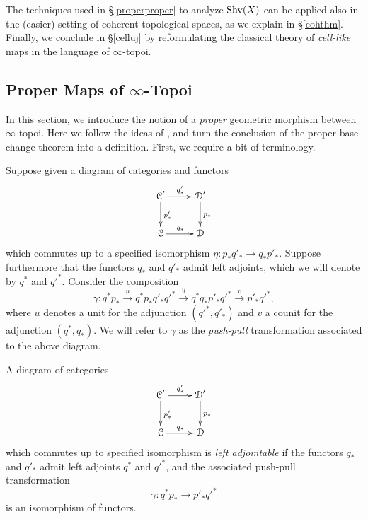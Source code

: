The techniques used in \S \ref{properproper} to analyze $\operatorname{Shv}(X)$ can be applied also in the (easier) setting of coherent topological spaces, as we explain in \S \ref{cohthm}. Finally, we conclude in \S \ref{celluj} by reformulating the classical theory of {\em cell-like} maps in the language of $\infty$-topoi.

\subsection{Proper Maps of $\infty$-Topoi}\label{propertopoi}

In this section, we introduce the notion of a {\em proper} geometric morphism between $\infty$-topoi. Here we follow the ideas of \cite{moerdijk}, and turn the conclusion of the proper base change theorem into a definition. First, we require a bit of terminology.

Suppose given a diagram of categories and functors
$$ \xymatrix{ \calC' \ar[r]^{q'_{\ast}} \ar[d]^{p'_{\ast}} & \calD' \ar[d]^{p_{\ast}} \\
\calC \ar[r]^{q_{\ast}} & \calD }$$
which commutes up to a specified isomorphism 
$\eta: p_{\ast} q'_{\ast} \rightarrow
q_{\ast} p'_{\ast}$. Suppose furthermore that the functors $q_{\ast}$ and $q'_{\ast}$ admit
left adjoints, which we will denote by $q^{\ast}$ and ${q'}^{\ast}$. Consider the composition
$$ \gamma: q^{\ast} p_{\ast} \stackrel{u}{\rightarrow} q^{\ast} p_{\ast} q'_{\ast} {q'}^{\ast}
\stackrel{\eta}{\rightarrow} q^{\ast} q_{\ast} p'_{\ast} {q'}^{\ast} \stackrel{v}{\rightarrow}
p'_{\ast} {q'}^{\ast},$$
where $u$ denotes a unit for the adjunction $( {q'}^{\ast}, q'_{\ast})$ and $v$ a counit for the adjunction $( q^{\ast}, q_{\ast})$. We will refer to $\gamma$ as the {\it push-pull} transformation
associated to the above diagram.

\begin{definition}
A diagram of categories $$ \xymatrix{ \calC' \ar[r]^{q'_{\ast}} \ar[d]^{p'_{\ast}} & \calD' \ar[d]^{p_{\ast}} \\ \calC \ar[r]^{q_{\ast}} & \calD }$$ which commutes up to specified isomorphism is
{\it left adjointable} if the functors $q_{\ast}$ and $q'_{\ast}$ admit left adjoints
$q^{\ast}$ and ${q'}^{\ast}$, and the associated push-pull transformation
$$ \gamma: q^{\ast} p_{\ast} \rightarrow p'_{\ast} {q'}^{\ast}$$
is an isomorphism of functors.
\end{definition}

